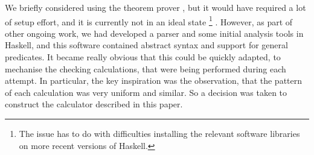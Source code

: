 We briefly considered using the  theorem prover
\cite{DBLP:conf/utp/Butterfield10,DBLP:conf/utp/Butterfield12},
but it would have required a lot of setup effort,
and it is currently not in an ideal state%
\footnote{The issue has to do with difficulties installing
the relevant software libraries
on more recent versions of Haskell.}
.
However, as part of other ongoing work,
we had developed a parser and some initial analysis tools
in Haskell\cite{Haskell2010},
and this software contained abstract syntax and support
for general predicates.
It became really obvious that this could be quickly adapted,
to mechanise the checking calculations, that were being performed
during each attempt.
In particular,
the key inspiration was the observation,
that the pattern of each calculation was very uniform and similar.
So a decision was taken to construct the calculator described in this paper.
